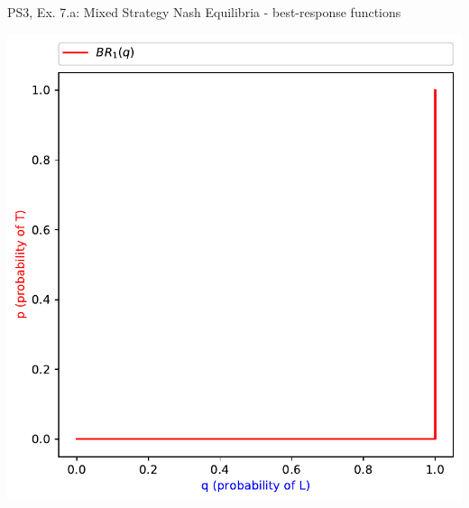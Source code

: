 \begin{frame}{PS3, Ex. 7.a: Mixed Strategy Nash Equilibria - best-response functions}
\begin{multicols}{2}
    \includegraphics[width=\columnwidth]{figures/5a1}
  \vfill\null
  \end{multicols}
\end{frame}
